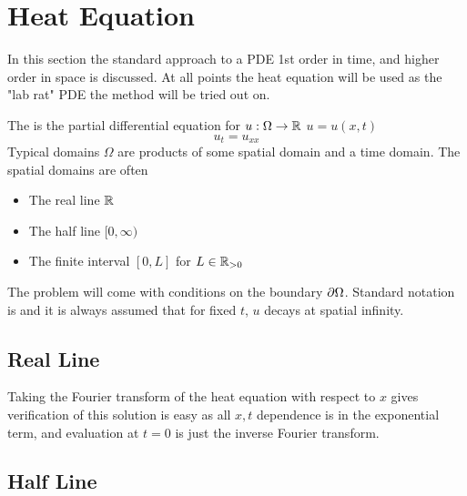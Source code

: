 \documentclass{article}
\begin{document}
\section{Heat Equation}
In this section the standard approach to a PDE 1st order in time, and higher order in space is discussed. At all points the heat equation will be used as the "lab rat" PDE the method will be tried out on. \\
\begin{definition}
The  is the partial differential equation for $u:\Omega \to \mathbb{R}$ $u=u(x,t)$
\[
u_t = u_{xx}
\]
Typical domains $\Omega$ are products of some spatial domain and a time domain. The spatial domains are often 
\begin{itemize}
    \item The real line $\mathbb{R}$
    \item The half line $[0,\infty)$
    \item The finite interval $[0,L]$ for $L\in\mathbb{R}_{>0}$
\end{itemize}
The problem will come with conditions on the boundary $\partial \Omega$. Standard notation is 
and it is always assumed that for fixed $t$, $u$ decays at spatial infinity.
\end{definition}

\subsection{Real Line}
Taking the Fourier transform of the heat equation with respect to $x$ gives 
verification of this solution is easy as all $x,t$ dependence is in the exponential term, and evaluation at $t=0$ is just the inverse Fourier transform. 
\subsection{Half Line}
\end{document}
